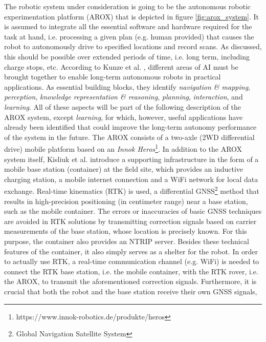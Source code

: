 \documentclass[english, master, utf8]{base/thesis_KBS}
\begin{document}
The robotic system under consideration is going to be the autonomous robotic experimentation platform (AROX) \cite{Kisliuk:2021} that is depicted in figure \ref{fig:arox_system}.
It is assumed to integrate all the essential software and hardware required for the task at hand, i.e. processing a given plan (e.g. human provided) that causes the robot
to autonomously drive to specified locations and record scans. As discussed, this should be possible over extended periods of time, i.e. long term, including charge stops, etc.
According to Kunze et al. \cite{Kunze:2018}, different areas of AI must be brought together to enable long-term autonomous robots in practical applications.
As essential building blocks, they identify \textit{navigation \& mapping}, \textit{perception}, \textit{knowledge representation \& reasoning}, \textit{planning},
\textit{interaction}, and \textit{learning}. All of these aspects will be part of the following description of the AROX system, except \textit{learning}, for which, however, 
useful applications have already been identified that could improve the long-term autonomy performance of the system in the future.\newline
The AROX consists of a two-axle (2WD differential drive) mobile platform based on an \textit{Innok Heros}\footnote{https://www.innok-robotics.de/produkte/heros}. \cite{Kisliuk:2021}
In addition to the AROX system itself, Kisliuk et al. introduce a supporting infrastructure in the form of a mobile base station (container) at the field site,
which provides an inductive charging station, a mobile internet connection and a WiFi network for local data exchange.
Real-time kinematics (RTK) is used, a differential GNSS\footnote{Global Navigation Satellite System} method that results in high-precision positioning (in centimeter range)
near a base station, such as the mobile container. The errors or inaccuracies of basic GNSS techniques are avoided in RTK solutions by transmitting correction signals based
on carrier measurements of the base station, whose location is precisely known. \cite{RTK_fundamentals} For this purpose, the container also provides an NTRIP server.
Besides these technical features of the container, it also simply serves as a shelter for the robot.
In order to actually use RTK, a real-time communication channel (e.g. WiFi) is needed to connect the RTK base station, i.e. the mobile container, with the RTK rover,
i.e. the AROX, to transmit the aforementioned correction signals. Furthermore, it is crucial that both the robot and the base station receive their own GNSS signals, 
\end{document}
